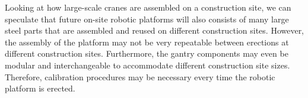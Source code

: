 Looking at how large-scale cranes are assembled on a construction site, we can speculate that future on-site robotic platforms will also consists of many large steel parts that are assembled and reused on different construction sites. However, the assembly of the platform may not be very repeatable between erections at different construction sites. Furthermore, the gantry components may even be modular and interchangeable to accommodate different construction site sizes. Therefore, calibration procedures may be necessary every time the robotic platform is erected.

